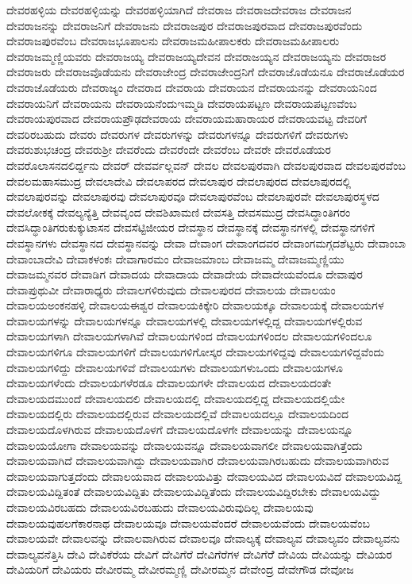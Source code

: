 {ದೇವರಹಳ್ಳಿಯ
ದೇವರಹಳ್ಳಿಯನ್ನು
ದೇವರಹಳ್ಳಿಯಾಗಿದೆ
ದೇವರಾಜ
ದೇವರಾಜದೇವರಾಜ
ದೇವರಾಜನ
ದೇವರಾಜನನ್ನು
ದೇವರಾಜನಿಗೆ
ದೇವರಾಜನು
ದೇವರಾಜಪುರ
ದೇವರಾಜಪುರವಾದ
ದೇವರಾಜಪುರವೆಂದು
ದೇವರಾಜಪುರವೆಂಬ
ದೇವರಾಜಭೂಪಾಲನು
ದೇವರಾಜಮಹೀಪಾಲಕರು
ದೇವರಾಜಮಹೀಪಾಲರು
ದೇವರಾಜಮ್ಮಣ್ಣಿಯವರು
ದೇವರಾಜಯ್ಯ
ದೇವರಾಜಯ್ಯದೇವನ
ದೇವರಾಜಯ್ಯನ
ದೇವರಾಜಯ್ಯನು
ದೇವರಾಜರ
ದೇವರಾಜರು
ದೇವರಾಜವೊಡೆಯನು
ದೇವರಾಜೇಂದ್ರ
ದೇವರಾಜೇಂದ್ರನಿಗೆ
ದೇವರಾಜೊಡೆಯನೂ
ದೇವರಾಜೊಡೆಯರ
ದೇವರಾಜೊಡೆಯರು
ದೇವರಾಜ್ಯಂ
ದೇವರಾದ
ದೇವರಾಯ
ದೇವರಾಯನ
ದೇವರಾಯನನ್ನು
ದೇವರಾಯನಿಂದ
ದೇವರಾಯನಿಗೆ
ದೇವರಾಯನು
ದೇವರಾಯನೆಂದುಇಮ್ಮಡಿ
ದೇವರಾಯಪಟ್ಟಣ
ದೇವರಾಯಪಟ್ಟಣವೆಂಬ
ದೇವರಾಯಪುರವಾದ
ದೇವರಾಯಪ್ರೌಢದೇವರಾಯ
ದೇವರಾಯಮಹಾರಾಯರ
ದೇವರಾಯವಟ್ಟ
ದೇವರಿಗೆ
ದೇವರಿರಬಹುದು
ದೇವರು
ದೇವರುಗಳ
ದೇವರುಗಳನ್ನು
ದೇವರುಗಳನ್ನೂ
ದೇವರುಗಳಿಗೆ
ದೇವರುಗಳು
ದೇವರುಶುಭಚಂದ್ರ
ದೇವರುಶ್ರೀ
ದೇವರೆಂದು
ದೇವರೆಂದೇ
ದೇವರೆಂಬ
ದೇವರೇ
ದೇವರೊಡೆಯರ
ದೇವರೊಲಾಸನದಲಿರ್ದ್ದನು
ದೇವರ್
ದೇವರ್ವಲ್ಲವನ್
ದೇವಲ
ದೇವಲಪುರವಾಗಿ
ದೇವಲಪುರವಾದ
ದೇವಲಪುರವೆಂಬ
ದೇವಲಮಹಾಸಮುದ್ರ
ದೇವಲಾದೇವಿ
ದೇವಲಾಪರದ
ದೇವಲಾಪುರ
ದೇವಲಾಪುರದ
ದೇವಲಾಪುರದಲ್ಲಿ
ದೇವಲಾಪುರವನ್ನು
ದೇವಲಾಪುರವು
ದೇವಲಾಪುರವೂ
ದೇವಲಾಪುರವೆಂಬ
ದೇವಲಾಪುರವೇ
ದೇವಲಾಪುರಸ್ಥಳದ
ದೇವಲೋಕಕ್ಕೆ
ದೇವಲ್ಯನ್ಯೆತ್ತಿ
ದೇವವೃಂದ
ದೇವಶಿಖಾಮಣಿ
ದೇವಸತ್ತಿ
ದೇವಸಮುದ್ರ
ದೇವಸಿದ್ಧಾಂತಿಗರಂ
ದೇವಸಿದ್ಧಾಂತಿಗರುಕುಕ್ಕುಟಾಸನ
ದೇವಸೆಟ್ಟಿಜೀಯರ
ದೇವಸ್ಥಾನ
ದೇವಸ್ಥಾನಕ್ಕೆ
ದೇವಸ್ಥಾನಗಳಲ್ಲಿ
ದೇವಸ್ಥಾನಗಳಿಗೆ
ದೇವಸ್ಥಾನಗಳು
ದೇವಸ್ಥಾನದ
ದೇವಸ್ಥಾನವನ್ನು
ದೇವಾ
ದೇವಾಂಗ
ದೇವಾಂಗದವರ
ದೇವಾಂಗಮಗ್ಗದಶೆಟ್ಟರು
ದೇವಾಂಬಾ
ದೇವಾಂಬಾದೇವಿ
ದೇವಾಕಳಂಕಃ
ದೇವಾಗಾರಮಂ
ದೇವಾಜಮಾಂಬ
ದೇವಾಜಮ್ಮ
ದೇವಾಜಮ್ಮಣ್ಣಿಯು
ದೇವಾಜಮ್ಮನವರ
ದೇವಾಡಿಗ
ದೇವಾದಯ
ದೇವಾದಾಯ
ದೇವಾದೇಯ
ದೇವಾದೇಯವೆಂದೂ
ದೇವಾಪುರ
ದೇವಾಪ್ರುಥುವೀ
ದೇವಾರಾಧ್ಯರು
ದೇವಾಲಗಳಿರುವುದು
ದೇವಾಲಪುರದ
ದೇವಾಲಯ
ದೇವಾಲಯಂ
ದೇವಾಲಯಅಂಕನಹಳ್ಳಿ
ದೇವಾಲಯಈಶ್ವರ
ದೇವಾಲಯಕಿಕ್ಕೇರಿ
ದೇವಾಲಯಕ್ಕೂ
ದೇವಾಲಯಕ್ಕೆ
ದೇವಾಲಯಗಳ
ದೇವಾಲಯಗಳನ್ನು
ದೇವಾಲಯಗಳನ್ನೂ
ದೇವಾಲಯಗಳಲ್ಲಿ
ದೇವಾಲಯಗಳಲ್ಲಿದ್ದ
ದೇವಾಲಯಗಳಲ್ಲಿರುವ
ದೇವಾಲಯಗಳಾಗಿ
ದೇವಾಲಯಗಳಾಗಿವೆ
ದೇವಾಲಯಗಳಿಂದ
ದೇವಾಲಯಗಳಿಂದಲ
ದೇವಾಲಯಗಳಿಂದಲೂ
ದೇವಾಲಯಗಳಿಗೂ
ದೇವಾಲಯಗಳಿಗೆ
ದೇವಾಲಯಗಳಿಗೋಸ್ಕರ
ದೇವಾಲಯಗಳಿದ್ದವು
ದೇವಾಲಯಗಳಿದ್ದವೆಂದು
ದೇವಾಲಯಗಳಿದ್ದು
ದೇವಾಲಯಗಳಿವೆ
ದೇವಾಲಯಗಳು
ದೇವಾಲಯಗಳುಒಂದು
ದೇವಾಲಯಗಳೂ
ದೇವಾಲಯಗಳೆಂದು
ದೇವಾಲಯಗಳೆರಡೂ
ದೇವಾಲಯಗಳೇ
ದೇವಾಲಯದ
ದೇವಾಲಯದಂತೇ
ದೇವಾಲಯದಮುಂದೆ
ದೇವಾಲಯದಲಿ
ದೇವಾಲಯದಲ್ಲಿ
ದೇವಾಲಯದಲ್ಲಿದ್ದ
ದೇವಾಲಯದಲ್ಲಿಯೇ
ದೇವಾಲಯದಲ್ಲಿರು
ದೇವಾಲಯದಲ್ಲಿರುವ
ದೇವಾಲಯದಲ್ಲಿವೆ
ದೇವಾಲಯದಲ್ಲೂ
ದೇವಾಲಯದಿಂದ
ದೇವಾಲಯದೊಳಗಿರುವ
ದೇವಾಲಯದೊಳಗೆ
ದೇವಾಲಯದೊಳಗೇ
ದೇವಾಲಯನ್ನು
ದೇವಾಲಯನ್ನೂ
ದೇವಾಲಯಯೋಗಾ
ದೇವಾಲಯವನ್ನು
ದೇವಾಲಯವನ್ನೂ
ದೇವಾಲಯವಾಗಲೀ
ದೇವಾಲಯವಾಗಿತ್ತೆಂದು
ದೇವಾಲಯವಾಗಿದೆ
ದೇವಾಲಯವಾಗಿದ್ದು
ದೇವಾಲಯವಾಗಿರ
ದೇವಾಲಯವಾಗಿರಬಹುದು
ದೇವಾಲಯವಾಗಿರುವ
ದೇವಾಲಯವಾಗುತ್ತದೆಂದು
ದೇವಾಲಯವಾದ
ದೇವಾಲಯವಿತ್ತು
ದೇವಾಲಯವಿದ
ದೇವಾಲಯವಿದೆ
ದೇವಾಲಯವಿದ್ದ
ದೇವಾಲಯವಿದ್ದಿತಂತೆ
ದೇವಾಲಯವಿದ್ದಿತು
ದೇವಾಲಯವಿದ್ದಿತೆಂದು
ದೇವಾಲಯವಿದ್ದಿರಬೇಕು
ದೇವಾಲಯವಿದ್ದು
ದೇವಾಲಯವಿರಬಹದು
ದೇವಾಲಯವಿರಬಹುದು
ದೇವಾಲಯವಿರುವುದಿಲ್ಲ
ದೇವಾಲಯವು
ದೇವಾಲಯವುಹಲಗೆಕಾರನಾಥ
ದೇವಾಲಯವೂ
ದೇವಾಲಯವೆಂದರೆ
ದೇವಾಲಯವೆಂದು
ದೇವಾಲಯವೆಂಬ
ದೇವಾಲಯವೇ
ದೇವಾಲವನ್ನು
ದೇವಾಲವಾಗಿರುವ
ದೇವಾಲವೂ
ದೇವಾಲ್ಯಕ್ಕೆ
ದೇವಾಲ್ಯವ
ದೇವಾಲ್ಯವಂ
ದೇವಾಲ್ಯವನು
ದೇವಾಲ್ಯವನೆತ್ತಿಸಿ
ದೇವಿ
ದೇವಿಕೆರೆಯ
ದೇವಿಗೆ
ದೇವಿಗೆರೆ
ದೇವಿಗೆರೆಗಳ
ದೇವಿಗೆರೆೆ
ದೇವಿಯ
ದೇವಿಯನ್ನು
ದೇವಿಯರ
ದೇವಿಯರಿಗೆ
ದೇವಿಯರು
ದೇವೀರಮ್ಮ
ದೇವೀರಮ್ಮಣ್ಣಿ
ದೇವೀರಮ್ಮನ
ದೇವೇಂದ್ರ
ದೇವೇಗೌಡ
ದೇವೋಜ
}

